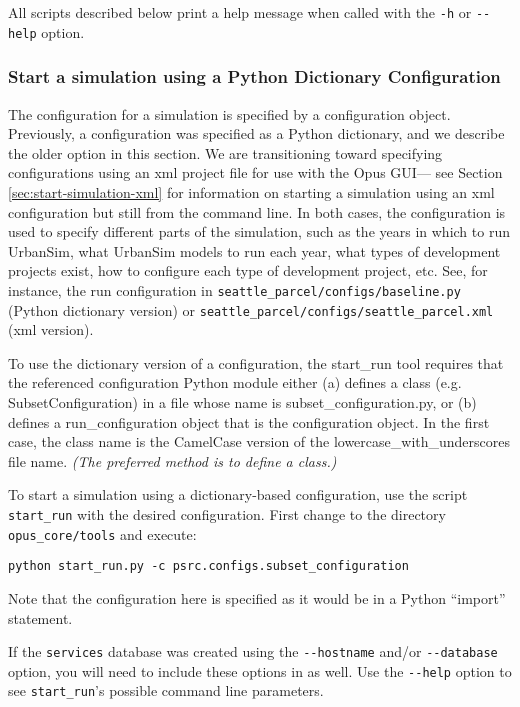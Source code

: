 All scripts described below print a help message when called with the
\verb|-h| or \verb|--help| option.

\subsubsection{Start a simulation using a Python Dictionary Configuration}

The configuration for a simulation is specified by a configuration object.
Previously, a configuration was specified as a Python dictionary, and we
describe the older option in this section.  We are transitioning toward
specifying configurations using an xml project file for use with the Opus
GUI--- see Section \ref{sec:start-simulation-xml} for information on
starting a simulation using an xml configuration but still from the command
line.  In both cases, the configuration is used to specify different parts
of the simulation, such as the years in which to run UrbanSim, what
UrbanSim models to run each year, what types of development
projects exist, how to configure each type of development project,
etc. See, for instance, the run configuration in
\verb|seattle_parcel/configs/baseline.py| (Python dictionary version) or
\verb|seattle_parcel/configs/seattle_parcel.xml| (xml version).

To use the dictionary version of a configuration, the start_run tool
requires that the referenced configuration Python module either (a) defines
a class (e.g. SubsetConfiguration) in a file whose name is
subset_configuration.py, or (b) defines a run_configuration object that is
the configuration object.  In the first case, the class name is the
CamelCase version of the lowercase_with_underscores file name.  \emph{(The
  preferred method is to define a class.)}

To start a simulation using a dictionary-based configuration, use the
script \verb|start_run| with the desired configuration.  First change to 
the directory \verb|opus_core/tools| and execute:
\begin{verbatim}
python start_run.py -c psrc.configs.subset_configuration
\end{verbatim}

Note that the configuration here is specified as it would be in a Python
``import'' statement.

If the \verb|services| database was created using the \verb|--hostname| and/or
\verb|--database| option, you will need to include these options in
 as well.  Use the \verb|--help| option to see
\verb|start_run|'s possible command line parameters.

